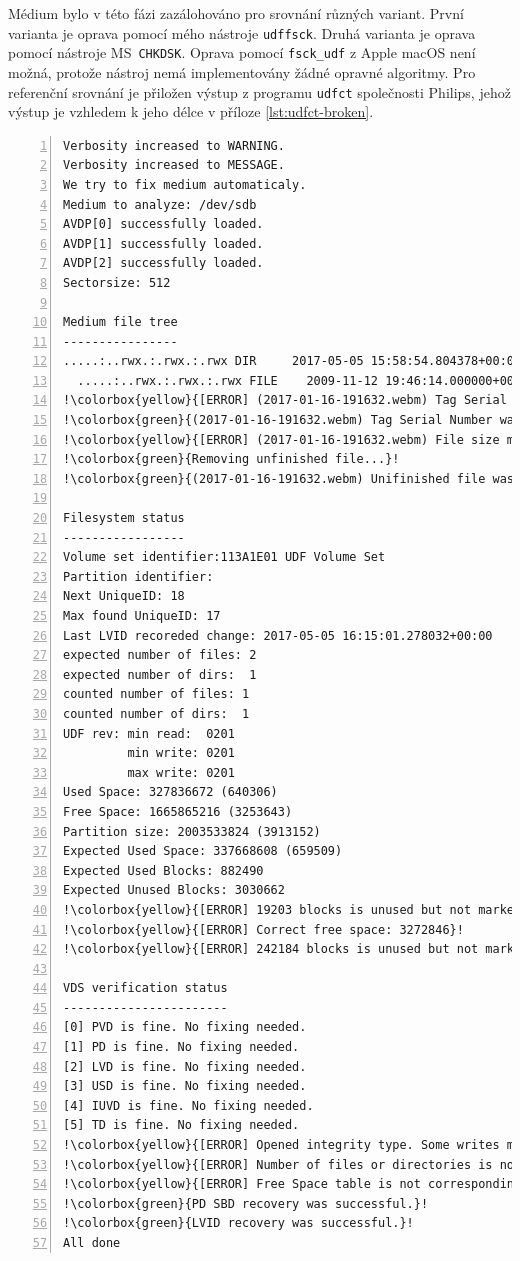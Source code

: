 Médium bylo v této fázi zazálohováno pro srovnání různých variant. První varianta je oprava pomocí mého nástroje \texttt{udffsck}. Druhá varianta je oprava pomocí nástroje MS~\texttt{CHKDSK}. Oprava pomocí \texttt{fsck\_udf} z Apple macOS není možná, protože nástroj nemá implementovány žádné opravné algoritmy. Pro referenční srovnání je přiložen výstup z programu \texttt{udfct} společnosti Philips, jehož výstup je vzhledem k jeho délce v příloze \ref{lst:udfct-broken}.\\
\begin{lstlisting}[frame=single,caption={Výsledek opravy poškozeného média programem \texttt{udffsck}},label=lst:udffsck-pass,basicstyle=\ttfamily\scriptsize, keywordstyle=\color{black}\bfseries\underbar,nolol,numbers=left,texcl=false,escapechar=!]
Verbosity increased to WARNING.
Verbosity increased to MESSAGE.
We try to fix medium automaticaly.
Medium to analyze: /dev/sdb
AVDP[0] successfully loaded.
AVDP[1] successfully loaded.
AVDP[2] successfully loaded.
Sectorsize: 512

Medium file tree
----------------
.....:..rwx.:.rwx.:.rwx DIR     2017-05-05 15:58:54.804378+00:00       152  <ROOT>
  .....:..rwx.:.rwx.:.rwx FILE    2009-11-12 19:46:14.000000+00:00  327345425  "gtd.mp4"
!\colorbox{yellow}{[ERROR] (2017-01-16-191632.webm) Tag Serial Number differs.}!
!\colorbox{green}{(2017-01-16-191632.webm) Tag Serial Number was fixed.}!
!\colorbox{yellow}{[ERROR] (2017-01-16-191632.webm) File size mismatch. Probably unfinished file write.}!
!\colorbox{green}{Removing unfinished file...}!
!\colorbox{green}{(2017-01-16-191632.webm) Unifinished file was removed.}!

Filesystem status
-----------------
Volume set identifier:113A1E01 UDF Volume Set
Partition identifier:
Next UniqueID: 18
Max found UniqueID: 17
Last LVID recoreded change: 2017-05-05 16:15:01.278032+00:00
expected number of files: 2
expected number of dirs:  1
counted number of files: 1
counted number of dirs:  1
UDF rev: min read:  0201
         min write: 0201
         max write: 0201
Used Space: 327836672 (640306)
Free Space: 1665865216 (3253643)
Partition size: 2003533824 (3913152)
Expected Used Space: 337668608 (659509)
Expected Used Blocks: 882490
Expected Unused Blocks: 3030662
!\colorbox{yellow}{[ERROR] 19203 blocks is unused but not marked as unallocated in Free Space Table.}!
!\colorbox{yellow}{[ERROR] Correct free space: 3272846}!
!\colorbox{yellow}{[ERROR] 242184 blocks is unused but not marked as unallocated in SBD.}!

VDS verification status
-----------------------
[0] PVD is fine. No fixing needed.
[1] PD is fine. No fixing needed.
[2] LVD is fine. No fixing needed.
[3] USD is fine. No fixing needed.
[4] IUVD is fine. No fixing needed.
[5] TD is fine. No fixing needed.
!\colorbox{yellow}{[ERROR] Opened integrity type. Some writes may be unfinished.}!
!\colorbox{yellow}{[ERROR] Number of files or directories is not corresponding to counted number}!
!\colorbox{yellow}{[ERROR] Free Space table is not corresponding to reality.}!
!\colorbox{green}{PD SBD recovery was successful.}!
!\colorbox{green}{LVID recovery was successful.}!
All done
\end{lstlisting}
